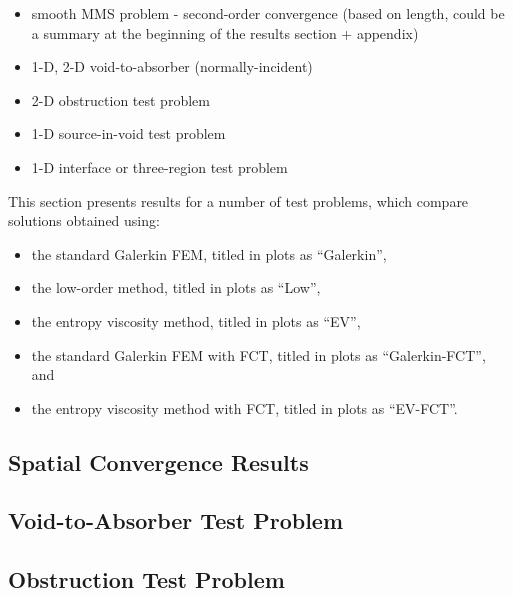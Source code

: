 \begin{itemize}
  \item smooth MMS problem - second-order convergence (based on length, could be a summary at the beginning of the results section + appendix)
  \item 1-D, 2-D void-to-absorber (normally-incident)
  \item 2-D obstruction test problem
  \item 1-D source-in-void test problem
  \item 1-D interface or three-region test problem
\end{itemize}

This section presents results for a number of test problems, which compare
solutions obtained using:
\begin{itemize}
  \item the standard Galerkin FEM, titled in plots as ``Galerkin'',
  \item the low-order method, titled in plots as ``Low'',
  \item the entropy viscosity method, titled in plots as ``EV'',
  \item the standard Galerkin FEM with FCT, titled in plots as ``Galerkin-FCT'', and
  \item the entropy viscosity method with FCT, titled in plots as ``EV-FCT''.
\end{itemize}

\subsection{Spatial Convergence Results}

\subsection{Void-to-Absorber Test Problem}

\subsection{Obstruction Test Problem}

